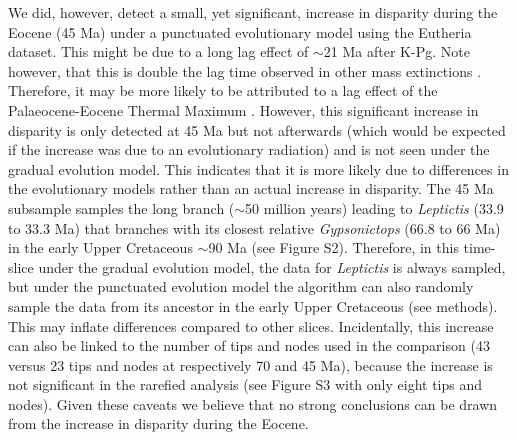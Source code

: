 \documentclass[12pt,letterpaper]{article}
\begin{document}


We did, however, detect a small, yet significant, increase in disparity during the Eocene (45 Ma) under a punctuated evolutionary model using the Eutheria dataset.
This might be due to a long lag effect of $\sim$21 Ma after K-Pg.
Note however, that this is double the lag time observed in other mass extinctions \citep{chen2012timing}.
Therefore, it may be more likely to be attributed to a lag effect of the Palaeocene-Eocene Thermal Maximum \citep[PETM; $\sim$11 Ma afterwards;][]{bininda2007delayed}.
However, this significant increase in disparity is only detected at 45 Ma but not afterwards (which would be expected if the increase was due to an evolutionary radiation) and is not seen under the gradual evolution model.
This indicates that it is more likely due to differences in the evolutionary models rather than an actual increase in disparity.
The 45 Ma subsample samples the long branch ($\sim$50 million years) leading to \textit{Leptictis} (33.9 to 33.3 Ma) that branches with its closest relative \textit{Gypsonictops} (66.8 to 66 Ma) in the early Upper Cretaceous $\sim$90 Ma (see Figure S2).
Therefore, in this time-slice under the gradual evolution model, the data for \textit{Leptictis} is always sampled, but under the punctuated evolution model the algorithm can also randomly sample the data from its ancestor in the early Upper Cretaceous (see methods).
This may inflate differences compared to other slices.
Incidentally, this increase can also be linked to the number of tips and nodes used in the comparison (43 versus 23 tips and nodes at respectively 70 and 45 Ma), because the increase is not significant in the rarefied analysis (see Figure S3 with only eight tips and nodes).
Given these caveats we believe that no strong conclusions can be drawn from the increase in disparity during the Eocene.
\end{document}
